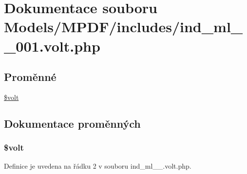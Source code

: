 \hypertarget{ind__ml__1__001_8volt_8php}{\section{Dokumentace souboru Models/\-M\-P\-D\-F/includes/ind\-\_\-ml\-\_\-\_\-001.volt.\-php}
\label{ind__ml__1__001_8volt_8php}
}
\subsection*{Proměnné}
\begin{DoxyCompactItemize}
\item 
\hyperlink{ind__ml__1__001_8volt_8php_a013d9bcd621d002433e25a82dd593989}{\$volt}
\end{DoxyCompactItemize}


\subsection{Dokumentace proměnných}
\hypertarget{ind__ml__1__001_8volt_8php_a013d9bcd621d002433e25a82dd593989}{
\subsubsection[{\$volt}]{\setlength{\rightskip}{0pt plus 5cm}\$volt}}\label{ind__ml__1__001_8volt_8php_a013d9bcd621d002433e25a82dd593989}


Definice je uvedena na řádku 2 v souboru ind\-\_\-ml\-\_\-\_.\-volt.\-php.

